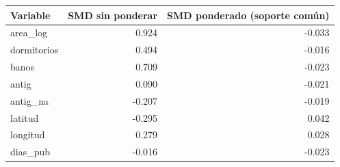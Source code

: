 \begin{tabular}{lrr}
\toprule
Variable & SMD sin ponderar & SMD ponderado (soporte común) \\
\midrule
area\_log & 0.924 & -0.033 \\
dormitorios & 0.494 & -0.016 \\
banos & 0.709 & -0.023 \\
antig & 0.090 & -0.021 \\
antig\_na & -0.207 & -0.019 \\
latitud & -0.295 & 0.042 \\
longitud & 0.279 & 0.028 \\
dias\_pub & -0.016 & -0.023 \\
\bottomrule
\end{tabular}